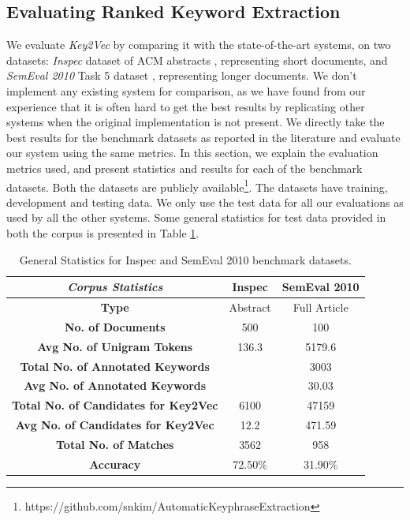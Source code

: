 \documentclass[conference]{IEEEtran}
\begin{document}
\subsection{Evaluating Ranked Keyword Extraction}
We evaluate \textit{Key2Vec} by comparing it with the state-of-the-art systems, on two datasets: \textit{Inspec} dataset of ACM abstracts \cite{hulth2003improved}, representing short documents, and \textit{SemEval 2010} Task 5 dataset \cite{kim2010semeval}, representing longer documents. We don't implement any existing system for comparison, as we have found from our experience that it is often hard to get the best results by replicating other systems when the original implementation is not present. We directly take the best results for the benchmark datasets as reported in the literature and evaluate our system using the same metrics. In this section, we explain the evaluation metrics used, and present statistics and results for each of the benchmark datasets. Both the datasets are publicly available\footnote{https://github.com/snkim/AutomaticKeyphraseExtraction}. The datasets have training, development and testing data. We only use the test data for all our evaluations as used by all the other systems. Some general statistics for test data provided in both the corpus is presented in Table \ref{general-stats}.

\begin{table}[htbp]
\centering
\footnotesize
\caption{General Statistics for Inspec and SemEval 2010 benchmark datasets.}
\label{general-stats}
\begin{tabular}{|c|c|c|}
\hline
\textit{\textbf{Corpus Statistics}} & \textbf{Inspec} & \textbf{SemEval 2010} \\ \hline
\textbf{Type} & Abstract & Full Article \\ \hline
\textbf{No. of Documents} & 500 & 100 \\ \hline
\textbf{Avg No. of Unigram Tokens \cite{bougouin2013topicrank}} & 136.3 & 5179.6 \\ \hline
\textbf{Total No. of Annotated Keywords} &  & 3003 \\ \hline
\textbf{Avg No. of Annotated Keywords} &  & 30.03 \\ \hline
\textbf{Total No. of Candidates for Key2Vec} &  6100 & 47159 \\ \hline
\textbf{Avg No. of Candidates for Key2Vec} & 12.2 & 471.59 \\ \hline
\textbf{Total No. of Matches} & 3562 & 958 \\ \hline
\textbf{Accuracy} & 72.50\% & 31.90\% \\ \hline 
\end{tabular}
\end{table}
\end{document}
